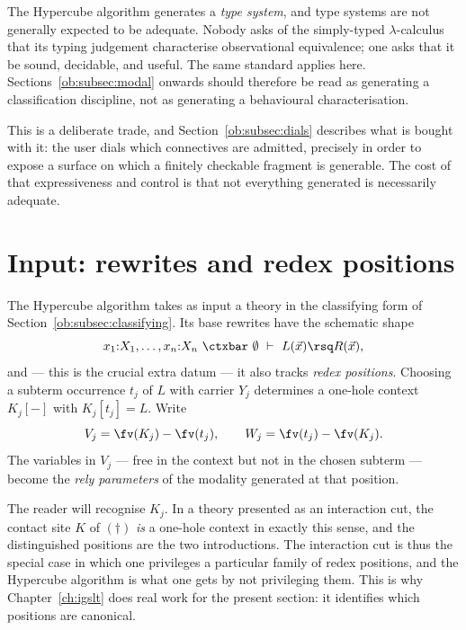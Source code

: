\begin{remark}
\label{ob:rem:no-adequacy}
The Hypercube algorithm generates a \emph{type system}, and type systems are not
generally expected to be adequate. Nobody asks of the simply-typed $\lambda$-calculus
that its typing judgement characterise observational equivalence; one asks that it be
sound, decidable, and useful. The same standard applies here. Sections~\ref{ob:subsec:modal}
onwards should therefore be read as generating a classification discipline, not as
generating a behavioural characterisation.
\end{remark}

This is a deliberate trade, and Section~\ref{ob:subsec:dials} describes what is bought with
it: the user dials which connectives are admitted, precisely in order to expose a surface
on which a finitely checkable fragment is generable. The cost of that expressiveness and
control is that not everything generated is necessarily adequate.

\section{Input: rewrites and redex positions}

The Hypercube algorithm takes as input a theory in the classifying form of
Section~\ref{ob:subsec:classifying}. Its base rewrites have the schematic shape
\[
  x_1{:}X_1, \dots, x_n{:}X_n \ \ctxbar\ \emptyset \ \vdash\ L(\vec x) \rsq R(\vec x) ,
\]
and --- this is the crucial extra datum --- it also tracks \emph{redex positions}.
Choosing a subterm occurrence $t_j$ of $L$ with carrier $Y_j$ determines a one-hole
context $K_j[-]$ with $K_j[t_j] = L$. Write
\[
  V_j = \fv(K_j) - \fv(t_j), \qquad W_j = \fv(t_j) - \fv(K_j) .
\]
The variables in $V_j$ --- free in the context but not in the chosen subterm --- become
the \emph{rely parameters} of the modality generated at that position.

\begin{remark}
The reader will recognise $K_j$. In a theory presented as an interaction cut, the contact
site $K$ of $(\dagger)$ \emph{is} a one-hole context in exactly this sense, and the
distinguished positions are the two introductions. The interaction cut is thus the
special case in which one privileges a particular family of redex positions, and the
Hypercube algorithm is what one gets by not privileging them. This is why
Chapter~\ref{ch:igslt} does real work for the present section: it identifies which
positions are canonical.
\end{remark}

